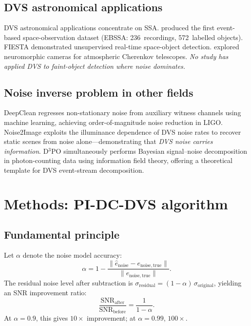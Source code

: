 \documentclass[twocolumn]{article}
\begin{document}
\subsection{DVS astronomical applications}

DVS astronomical applications concentrate on SSA.
\citet{C1} produced the first event-based space-observation dataset (EBSSA: 236~recordings, 572~labelled objects).
FIESTA \citep{C3} demonstrated unsupervised real-time space-object detection.
\citet{C5} explored neuromorphic cameras for atmospheric Cherenkov telescopes.
\emph{No study has applied DVS to faint-object detection where noise dominates.}

\subsection{Noise inverse problem in other fields}

DeepClean \citep{D1} regresses non-stationary noise from auxiliary witness channels using machine learning, achieving order-of-magnitude noise reduction in LIGO.
Noise2Image \citep{D5} exploits the illuminance dependence of DVS noise rates to recover static scenes from noise alone---demonstrating that \emph{DVS noise carries information}.
D$^3$PO \citep{D7} simultaneously performs Bayesian signal--noise decomposition in photon-counting data using information field theory, offering a theoretical template for DVS event-stream decomposition.


\section{Methods: PI-DC-DVS algorithm}
\label{sec:algorithm}

\subsection{Fundamental principle}

Let $\alpha$ denote the noise model accuracy:
\begin{equation}
  \alpha = 1 - \frac{\|\hat{e}_\mathrm{noise} - e_\mathrm{noise,true}\|}{\|e_\mathrm{noise,true}\|}.
  \label{eq:alpha}
\end{equation}
The residual noise level after subtraction is $\sigma_\mathrm{residual} = (1-\alpha)\,\sigma_\mathrm{original}$, yielding an SNR improvement ratio:
\begin{equation}
  \frac{\mathrm{SNR}_\mathrm{after}}{\mathrm{SNR}_\mathrm{before}} = \frac{1}{1-\alpha}.
  \label{eq:snr}
\end{equation}
At $\alpha=0.9$, this gives $10\times$ improvement; at $\alpha=0.99$, $100\times$.
\end{document}
